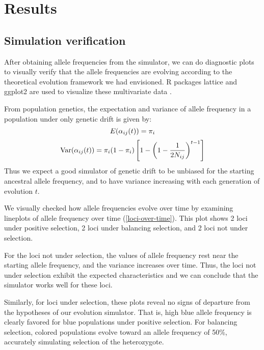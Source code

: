 \documentclass[a4paper,12pt]{article}
\begin{document}
\section{Results}

\subsection{Simulation verification}

After obtaining allele frequencies from the simulator, we can do
diagnostic plots to visually verify that the allele frequencies are
evolving according to the theoretical evolution framework we had
envisioned. R packages lattice and ggplot2 are used to visualize these
multivariate data \cite{lattice,ggplot2}.

From population genetics, the expectation and variance of allele
frequency in a population under only genetic drift is given by:
$$E(\alpha_{ij}(t))=\pi_i$$
$$\operatorname{Var}(\alpha_{ij}(t))=\pi_i(1-\pi_i)
\left[1-\left(1-\frac{1}{2N_{ij}}\right)^{t-1}\right]$$
Thus we expect a good simulator of genetic drift to be unbiased for
the starting ancestral allele frequency, and to have variance
increasing with each generation of evolution $t$.

We visually checked how allele frequencies evolve over time by
examining lineplots of allele frequency over time
(\autoref{loci-over-time}). This plot shows 2 loci under positive
selection, 2 loci under balancing selection, and 2 loci not under
selection.


For the loci not under selection, the values of allele frequency rest
near the starting allele frequency, and the variance increases over
time. Thus, the loci not under selection exhibit the expected
characteristics and we can conclude that the simulator works well for
these loci.

Similarly, for loci under selection, these plots reveal no signs of
departure from the hypotheses of our evolution simulator. That is,
high blue allele frequency is clearly favored for blue populations
under positive selection. For balancing selection, colored populations
evolve toward an allele frequency of 50\%, accurately simulating
selection of the heterozygote.
\end{document}

